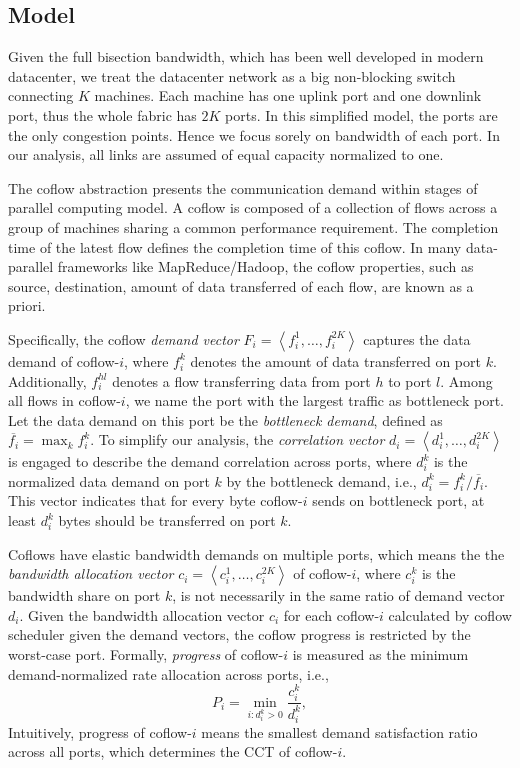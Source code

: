 \documentclass[10pt, conference, letterpaper]{IEEEtran}
\begin{document}
\subsection{Model}
Given the full bisection bandwidth, which has been well developed in modern datacenter\cite{jupiter}, we treat the datacenter network as a big non-blocking switch connecting $K$ machines. Each machine has one uplink port and one downlink port, thus the whole fabric has $2K$ ports. In this simplified model, the ports are the only congestion points. Hence we focus sorely on bandwidth of each port. In our analysis, all links are assumed of equal capacity normalized to one.

The coflow abstraction presents the communication demand within stages of parallel computing model. A coflow is composed of a collection of flows across a group of machines sharing a common performance requirement. The completion time of the latest flow defines the completion time of this coflow. In many data-parallel frameworks like MapReduce/Hadoop, the coflow properties, such as source, destination, amount of data transferred of each flow, are known as a priori\cite{varys, aalo, bingchuan}.

Specifically, the coflow \emph{demand vector} $F_i = \left\langle f_i^1,\dots,f_i^{2K}\right\rangle$ captures the data demand of coflow-$i$, where $f_i^k$ denotes the amount of data transferred on port $k$. Additionally, $f_i^{hl}$ denotes a flow transferring data from port $h$ to port $l$. Among all flows in coflow-$i$, we name the port with the largest traffic as bottleneck port. Let the data demand on this port be the \emph{bottleneck demand}, defined as $\overline{f_i}=\max_{k} f_i^k$. To simplify our analysis, the \emph{correlation vector} $d_i = \left\langle d_i^1,\dots,d_i^{2K}\right\rangle$ is engaged to describe the demand correlation across ports, where $d_i^k$ is the normalized data demand on port $k$ by the bottleneck demand, i.e., $d_i^k = f_i^k/\overline{f_i}$. This vector indicates that for every byte coflow-$i$ sends on bottleneck port, at least $d_i^k$ bytes should be transferred on port $k$.
 
Coflows have elastic bandwidth demands on multiple ports, which means the the \emph{bandwidth allocation vector} $c_i=\left\langle c_i^1,\dots,c_i^{2K}\right\rangle$ of coflow-$i$, where $c_i^k$ is the bandwidth share on port $k$, is not necessarily in the same ratio of demand vector $d_i$. Given the bandwidth allocation vector $c_i$ for each coflow-$i$ calculated by coflow scheduler given the demand vectors, the coflow progress is restricted by the worst-case port. Formally, \emph{progress} of coflow-$i$ is measured as the minimum demand-normalized rate allocation across ports, i.e.,
 \begin{equation}
 	P_i = \min\limits_{i:d_i^k>0}\frac{c_i^k}{d_i^k},
 \end{equation}
 Intuitively, progress of coflow-$i$ means the smallest demand satisfaction ratio across all ports, which determines the CCT of coflow-$i$.
 
\end{document}
